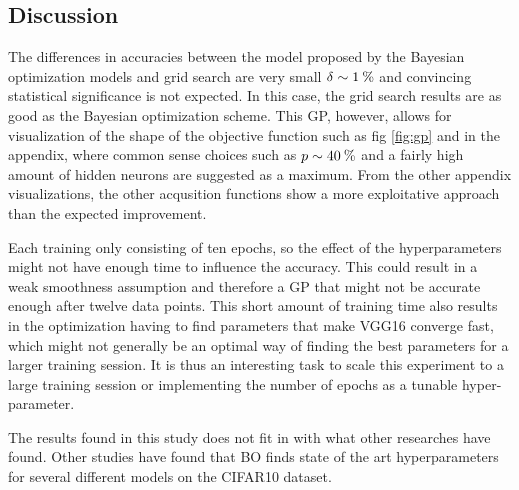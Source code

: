 \documentclass[12pt,fleqn]{article}
\begin{document}
\begin{multicols}{2}
\vspace*{-1.6cm}
\section{Discussion}
\vspace*{-0.2cm}
The differences in accuracies between the model proposed by the Bayesian optimization models and grid search are very small \(\delta \sim 1\:\text{\%{}} \) and convincing statistical significance is not expected. In this case, the grid search results are as good as the Bayesian optimization scheme. This GP, however, allows for visualization of the shape of the objective function such as fig \ref{fig:gp} and in the appendix, where common sense choices such as \(p\sim 40\:\text{\%{}} \) and a fairly high amount of hidden neurons are suggested as a maximum. From the other appendix visualizations, the other acqusition functions show a more exploitative approach than the expected improvement.

Each training only consisting of ten epochs, so the effect of the hyperparameters might not have enough time to influence the accuracy. This could result in a weak smoothness assumption and therefore a GP that might not be accurate enough after twelve data points. This short amount of training time also results in the optimization having to find parameters that make VGG16 converge fast, which might not generally be an optimal way of finding the best parameters for a larger training session. It is thus an interesting task to scale this experiment to a large training session or implementing the number of epochs as a tunable hyper-parameter.  

The results found in this study does not fit in with what other researches have found. Other studies have found that BO finds state of the art hyperparameters for several different models on the CIFAR10 dataset. \cite{baylearn, baylearn2} 

\vspace*{-0.3cm}

\end{multicols}
\end{document}

